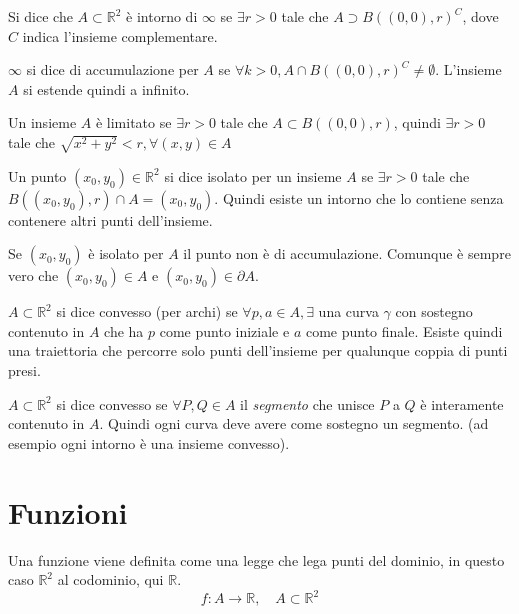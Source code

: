 \begin{definition}
	Si dice che $A\subset \mathbb{R}^2$ è intorno di $\infty$ se $\exists r>0$ tale che $A\supset B((0, 0), r)^C$, dove $C$ indica l'insieme complementare.
\end{definition}

\begin{definition}
	$\infty$ si dice di accumulazione per $A$ se $\forall k>0, A\cap B((0, 0), r)^C\neq \emptyset$. L'insieme $A$ si estende quindi a infinito.
\end{definition}

\begin{definition}
	Un insieme $A$ è limitato se $\exists r>0$ tale che $A\subset B((0, 0), r)$, quindi $\exists r>0$ tale che $\sqrt{x^2+y^2}<r, \forall (x, y)\in A$
\end{definition}

\begin{definition}
	Un punto $(x_0, y_0)\in \mathbb{R}^2$ si dice isolato per un insieme $A$ se $\exists r>0$ tale che $B((x_0, y_0), r)\cap A={(x_0, y_0)}$. Quindi esiste un intorno che lo contiene senza contenere altri punti dell'insieme.
\end{definition}

\begin{observation}
	Se $(x_0, y_0)$ è isolato per $A$ il punto non è di accumulazione. Comunque è sempre vero che $(x_0, y_0)\in A$ e $(x_0, y_0)\in \partial A$.
\end{observation}

\begin{definition}
	$A\subset \mathbb{R}^2$ si dice convesso (per archi) se $\forall p, a\in A, \exists$ una curva $\gamma$ con sostegno contenuto in $A$ che ha $p$ come punto iniziale e $a$ come punto finale. Esiste quindi una traiettoria che percorre solo punti dell'insieme per qualunque coppia di punti presi.
\end{definition}

\begin{definition}
	$A\subset \mathbb{R}^2$ si dice convesso se $\forall P, Q\in A$ il \emph{segmento} che unisce $P$ a $Q$ è interamente contenuto in $A$. Quindi ogni curva deve avere come sostegno un segmento. (ad esempio ogni intorno è una insieme convesso).
\end{definition}

\section{Funzioni}
Una funzione viene definita come una legge che lega punti del dominio, in questo caso $\mathbb{R}^2$ al codominio, qui $\mathbb{R}$.
\begin{equation}
	f:A\rightarrow\mathbb{R}, \quad A\subset \mathbb{R}^2
\end{equation}

